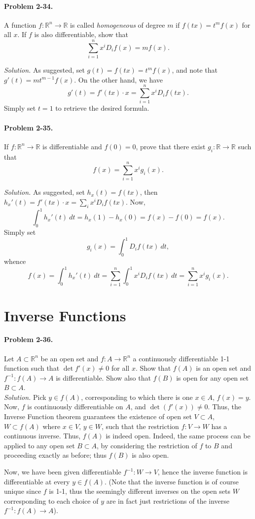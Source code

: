 \documentclass[11pt]{report}
\newcommand{\R}{\mathbb{R}}
\newcommand{\problem}[1]{\paragraph{Problem #1.}}
\newcommand{\solution}{\noindent\textit{Solution.} }
\begin{document}
    \problem{2-34} A function $f\colon \R^n \to \R$ is called \emph{homogeneous} of
    degree $m$ if $f(tx) = t^mf(x)$ for all $x$. If $f$ is also differentiable, show
    that \[
        \sum_{i = 1}^n x^iD_if(x) = mf(x).
    \] 

    \solution As suggested, set $g(t) = f(tx) = t^m f(x)$, and note that $g'(t) =
    mt^{m - 1}f(x)$. On the other hand, we have \[
        g'(t) = f'(tx) \cdot x = \sum_{i = 1}^n x^iD_if(tx).
    \] Simply set $t = 1$ to retrieve the desired formula.

    
    \problem{2-35} If $f\colon \R^n \to \R$ is differentiable and $f(0) = 0$, prove
    that there exist $g_i\colon \R \to \R$ such that \[
        f(x) = \sum_{i = 1}^n x^ig_i(x).
    \] 

    \solution As suggested, set $h_x(t) = f(tx)$, then $h_x'(t) = f'(tx)\cdot x =
    \sum_{i} x^i D_if(tx)$. Now, \[
        \int_0^1 h_x'(t)\:dt = h_x(1) - h_x(0) = f(x) - f(0) = f(x).
    \] Simply set \[
        g_i(x) = \int_0^1 D_if(tx)\:dt,
    \] whence \[
        f(x) = \int_0^1 h_x'(t)\:dt = \sum_{i = 1}^n \int_0^1 x^i D_if(tx)\:dt =
        \sum_{i = 1}^n x^i g_i(x).
    \] 


    \section{Inverse Functions}
    
    \problem{2-36} Let $A \subset \R^n$ be an open set and $f\colon A \to \R^n$ a
    continuously differentiable 1-1 function such that $\det{f'(x)} \neq 0$ for all
    $x$. Show that $f(A)$ is an open set and $f^{-1}\colon f(A) \to A$ is
    differentiable. Show also that $f(B)$ is open for any open set $B \subset A$. \\

    \solution Pick $y \in f(A)$, corresponding to which there is one $x \in A$, $f(x)
    = y$. Now, $f$ is continuously differentiable on $A$, and $\det(f'(x)) \neq 0$.
    Thus, the Inverse Function theorem guarantees the existence of open set $V
    \subset A$, $W \subset f(A)$ where $x \in V$, $y \in W$, such that the
    restriction $f\colon V \to W$ has a continuous inverse. Thus, $f(A)$ is indeed
    open. Indeed, the same process can be applied to any open set $B\subset A$, by
    considering the restriction of $f$ to $B$ and proceeding exactly as before; thus
    $f(B)$ is also open.

    Now, we have been given differentiable $f^{-1}\colon W \to V$, hence the inverse
    function is differentiable at every $y \in f(A)$. (Note that the inverse function
    is of course unique since $f$ is 1-1, thus the seemingly different inverses on
    the open sets $W$ corresponding to each choice of $y$ are in fact just
    restrictions of the inverse $f^{-1}\colon f(A) \to A$).
\end{document}
